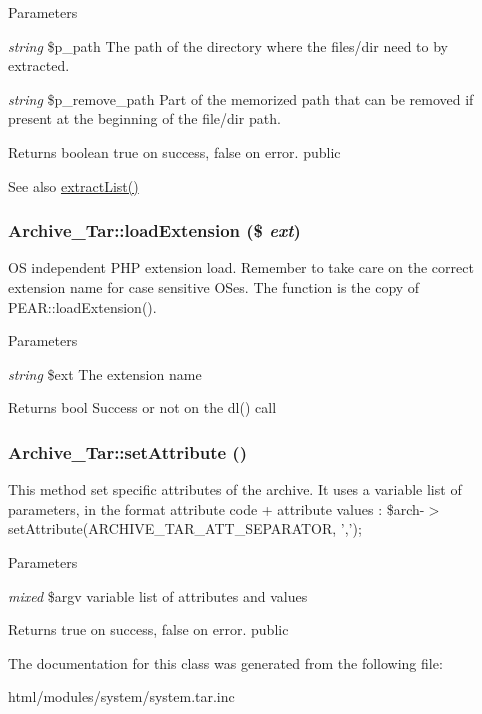 \begin{DoxyParams}{Parameters}
\item[{\em string}]\$p\_\-path The path of the directory where the files/dir need to by extracted. \item[{\em string}]\$p\_\-remove\_\-path Part of the memorized path that can be removed if present at the beginning of the file/dir path. \end{DoxyParams}
\begin{DoxyReturn}{Returns}
boolean true on success, false on error.  public 
\end{DoxyReturn}
\begin{DoxySeeAlso}{See also}
\hyperlink{classArchive__Tar_af670430ca3efa3f4850a2cd1347c7d59}{extractList()} 
\end{DoxySeeAlso}
\hypertarget{classArchive__Tar_a167fc59d011b7581e74a75c9fe899256}{
\subsubsection[{loadExtension}]{\setlength{\rightskip}{0pt plus 5cm}Archive\_\-Tar::loadExtension (\$ {\em ext})}}
\label{classArchive__Tar_a167fc59d011b7581e74a75c9fe899256}
OS independent PHP extension load. Remember to take care on the correct extension name for case sensitive OSes. The function is the copy of PEAR::loadExtension().


\begin{DoxyParams}{Parameters}
\item[{\em string}]\$ext The extension name \end{DoxyParams}
\begin{DoxyReturn}{Returns}
bool Success or not on the dl() call 
\end{DoxyReturn}
\hypertarget{classArchive__Tar_a23243800cb7b3a4ae6640c2f48f076bd}{
\subsubsection[{setAttribute}]{\setlength{\rightskip}{0pt plus 5cm}Archive\_\-Tar::setAttribute ()}}
\label{classArchive__Tar_a23243800cb7b3a4ae6640c2f48f076bd}
This method set specific attributes of the archive. It uses a variable list of parameters, in the format attribute code + attribute values : \$arch-\/$>$setAttribute(ARCHIVE\_\-TAR\_\-ATT\_\-SEPARATOR, ','); 
\begin{DoxyParams}{Parameters}
\item[{\em mixed}]\$argv variable list of attributes and values \end{DoxyParams}
\begin{DoxyReturn}{Returns}
true on success, false on error.  public 
\end{DoxyReturn}


The documentation for this class was generated from the following file:\begin{DoxyCompactItemize}
\item 
html/modules/system/system.tar.inc\end{DoxyCompactItemize}
